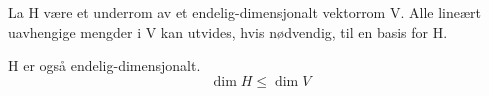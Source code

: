 La H være et underrom av et endelig-dimensjonalt vektorrom V.
Alle lineært uavhengige mengder i V kan utvides, hvis nødvendig,
til en basis for H.

H er også endelig-dimensjonalt.
$$\dim{H} \leq \dim{V}$$
